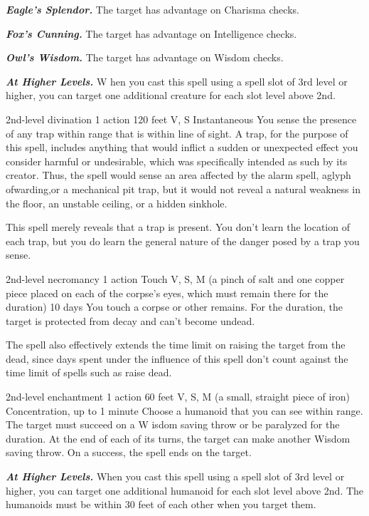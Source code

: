 \documentclass[10pt,twoside,twocolumn,openany]{book}
\newcommand\impact[1]{
	\textbf{\textit{#1}}
}
\begin{document}
\impact{Eagle’s Splendor.} The target has advantage on Charisma checks.

\impact{Fox’s Cunning.} The target has advantage on Intelligence checks.

\impact{Owl’s Wisdom.} The target has advantage on Wisdom checks.

\impact{At Higher Levels.} W hen you cast this spell using a spell slot of 3rd level or higher, you can target one additional creature for each slot level above 2nd.

{2nd-level divination}
{\color{action}1 action}
{120 feet}
{V, S}
{Instantaneous}
%
You sense the presence of any trap within range that is within line of sight. A trap, for the purpose of this spell, includes anything that would inflict a sudden or unexpected effect you consider harmful or undesirable, which was specifically intended as such by its creator. Thus, the spell would sense an area affected by the alarm spell, aglyph ofwarding,or a mechanical pit trap, but it would not reveal a natural weakness in the floor, an unstable ceiling, or a hidden sinkhole.

This spell merely reveals that a trap is present. You don’t learn the location of each trap, but you do learn the general nature of the danger posed by a trap you sense.

{2nd-level necromancy}
{\color{action}1 action}
{Touch}
{V, S, M (a pinch of salt and one copper piece placed on each of the corpse’s eyes, which must remain there for the duration)}
{10 days}
%
You touch a corpse or other remains. For the duration, the target is protected from decay and can’t become undead.

The spell also effectively extends the time limit on raising the target from the dead, since days spent under the influence of this spell don’t count against the time limit of spells such as raise dead.

{2nd-level enchantment}
{\color{action}1 action}
{60 feet}
{V, S, M (a small, straight piece of iron)}
{{\color{concentration}Concentration}, up to 1 minute}
%
Choose a humanoid that you can see within range. The target must succeed on a W isdom saving throw or be paralyzed for the duration. At the end of each of its turns, the target can make another Wisdom saving throw. On a success, the spell ends on the target.

\impact{At Higher Levels.} When you cast this spell using a spell slot of 3rd level or higher, you can target one additional humanoid for each slot level above 2nd. The humanoids must be within 30 feet of each other when you target them.
\end{document}
